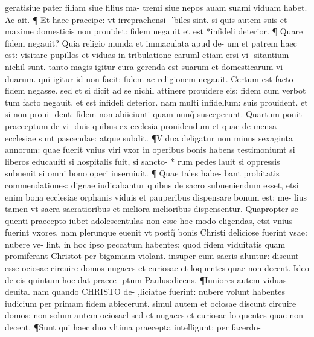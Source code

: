 \documentclass{article}
\begin{document}
\begin{pages}
geratisiue pater filiam siue filius ma- tremi siue nepos auam suami viduam habet. Ac ait. ¶ Et haec praecipe: vt irrepraehensi- 'biles sint. si quis autem suis et maxime domesticis non prouidet: fidem negauit et est *infideli deterior. ¶ Quare fidem negauit? Quia religio munda et immaculata apud de- um et patrem haec est: visitare pupillos et viduas in tribulatione earuml etiam ersi vi- sitantium nichil sunt. tanto magis igitur cura gerenda est suarum et domesticarum vi- duarum. qui igitur id non facit: fidem ac religionem negauit. Certum est facto fidem negasse. sed et si dicit ad se nichil attinere prouidere eis: fidem cum verbot tum facto negauit. et est infideli deterior. nam multi infidellum: suis prouident. et si non proui- dent: fidem non abiiciunti quam nunq̃ susceperunt. Quartum ponit praeceptum de vi- duis quibus ex ecclesia prouidendum et quae de mensa ecclesiae sunt pascendae: atque  subdit. ¶Vidua deligatur non minus sexaginta annorum: quae fuerit vnius viri vxor   in operibus bonis habens testimoniumt si liberos educauiti si hospitalis fuit, si sancto- * rum pedes lauit si oppressis subuenit si omni bono operi inseruiuit. ¶ Quae tales habe- bant probitatis commendationes: dignae iudicabantur quibus de sacro subueniendum esset, etsi enim bona ecclesiae orphanis viduis et pauperibus dispensare bonum est: me- lius tamen vt sacra sacratioribus et meliora melioribus dispensentur. Quapropter se- quenti praecepto iubet adolescentulas non esse hoc modo eligendas, etsi vnius fuerint vxores. nam plerunque euenit vt postq̃ bonis Christi deliciose fuerint vsae: nubere ve- lint, in hoc ipso peccatum habentes: quod fidem viduitatis quam promiferant Christot per bigamiam violant. insuper cum sacris aluntur: discunt esse ociosae circuire domos  nugaces et curiosae et loquentes quae non decent. Ideo de eis quintum hoc dat praece- ptum Paulus:dicens. ¶Iuniores autem viduas deuita. nam quando CHRISTO de- ,liciatae fuerint: nubere volunt habentes iudicium per primam fidem abiecerunt. simul  autem et ociosae discunt circuire domos: non solum autem ociosael sed et nugaces et curiosae lo quentes quae non decent. ¶Sunt qui haec duo vltima praecepta intelligunt: per facerdo-  \pend

\end{pages}
\end{document}
